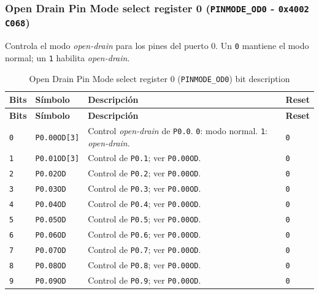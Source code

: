 \subsubsection{Open Drain Pin Mode select register 0 (\texttt{PINMODE\_OD0} - \texttt{0x4002 C068})}
Controla el modo \textit{open-drain} para los pines del puerto 0. Un \texttt{0} mantiene el modo normal; un \texttt{1} habilita \textit{open-drain}.

\begin{longtable}{|>{\raggedright\arraybackslash}p{}|>{\raggedright\arraybackslash}p{}|>{\raggedright\arraybackslash}p{}|>{\centering\arraybackslash}p{}|}
\caption{Open Drain Pin Mode select register 0 (\texttt{PINMODE\_OD0}) bit description}\\
\hline
\textbf{Bits} & \textbf{Símbolo} & \textbf{Descripción} & \textbf{Reset} \\
\hline
\endfirsthead
\hline
\textbf{Bits} & \textbf{Símbolo} & \textbf{Descripción} & \textbf{Reset} \\
\hline
\endhead
\texttt{0} & \texttt{P0.00OD[3]} & Control \textit{open-drain} de \texttt{P0.0}. \texttt{0}: modo normal. \texttt{1}: \textit{open-drain}. & \texttt{0} \\
\hline
\texttt{1} & \texttt{P0.01OD[3]} & Control de \texttt{P0.1}; ver \texttt{P0.00OD}. & \texttt{0} \\
\hline
\texttt{2} & \texttt{P0.02OD} & Control de \texttt{P0.2}; ver \texttt{P0.00OD}. & \texttt{0} \\
\hline
\texttt{3} & \texttt{P0.03OD} & Control de \texttt{P0.3}; ver \texttt{P0.00OD}. & \texttt{0} \\
\hline
\texttt{4} & \texttt{P0.04OD} & Control de \texttt{P0.4}; ver \texttt{P0.00OD}. & \texttt{0} \\
\hline
\texttt{5} & \texttt{P0.05OD} & Control de \texttt{P0.5}; ver \texttt{P0.00OD}. & \texttt{0} \\
\hline
\texttt{6} & \texttt{P0.06OD} & Control de \texttt{P0.6}; ver \texttt{P0.00OD}. & \texttt{0} \\
\hline
\texttt{7} & \texttt{P0.07OD} & Control de \texttt{P0.7}; ver \texttt{P0.00OD}. & \texttt{0} \\
\hline
\texttt{8} & \texttt{P0.08OD} & Control de \texttt{P0.8}; ver \texttt{P0.00OD}. & \texttt{0} \\
\hline
\texttt{9} & \texttt{P0.09OD} & Control de \texttt{P0.9}; ver \texttt{P0.00OD}. & \texttt{0} \\

\end{longtable}
